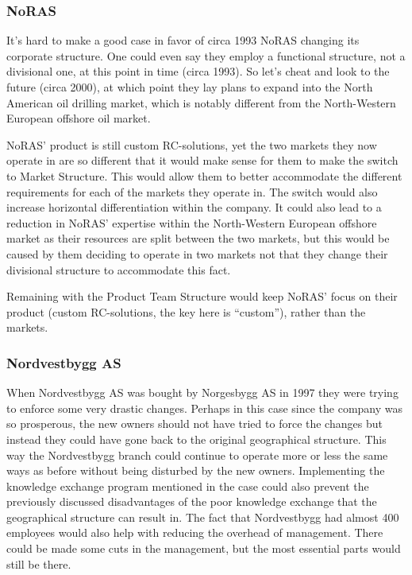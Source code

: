 \documentclass[a4paper]{article}
\begin{document}
    \subsubsection{NoRAS} It's hard to make a good case in favor of circa 1993
    NoRAS changing its corporate structure. One could even say they employ a
    functional structure, not a divisional one, at this point in time (circa
    1993). So let's cheat and look to the future (circa 2000), at which point
    they lay plans to expand into the North American oil drilling market,
    which is notably different from the North-Western European offshore oil
    market.


    NoRAS' product is still custom RC-solutions, yet the two markets they now
    operate in are so different that it would make sense for them to make the
    switch to Market Structure. This would allow them to better accommodate
    the different requirements for each of the markets they operate in.
    The switch would also increase horizontal differentiation within the
    company. It could also lead to a reduction in NoRAS' expertise within
    the North-Western European offshore market as their resources are split
    between the two markets, but this would be caused by them deciding to
    operate in two markets not that they change their divisional structure to
    accommodate this fact.


    Remaining with the Product Team Structure would keep NoRAS' focus on their
    product (custom RC-solutions, the key here is ``custom''), rather than the
    markets.


    \subsubsection{Nordvestbygg AS} When Nordvestbygg AS was bought by
    Norgesbygg AS in 1997 they were trying to enforce some very drastic
    changes. Perhaps in this case since the company was so prosperous, the
    new owners should not have tried to force the changes but instead they
    could have gone back to the original geographical structure. This way
    the Nordvestbygg branch could continue to operate more or less the same
    ways as before without being disturbed by the new owners. Implementing
    the knowledge exchange program mentioned in the case could also prevent
    the previously discussed disadvantages of the poor knowledge exchange
    that the geographical structure can result in. The fact that Nordvestbygg
    had almost 400 employees would also help with reducing the overhead of
    management. There could be made some cuts in the management, but the most
    essential parts would still be there.
\end{document}
